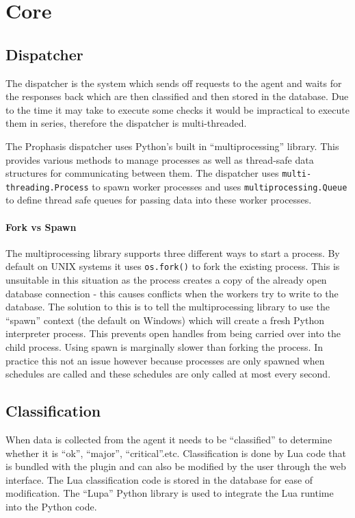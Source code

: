 \documentclass[bsc,logo,twoside,parskip,singlespacing,notimes]{infthesis}
\begin{document}
\section{Core}
\subsection{Dispatcher}

	The dispatcher is the system which sends off requests to the agent and waits
	for the responses back which are then classified and then stored in the
	database.  Due to the time it may take to execute some checks it would be
	impractical to execute them in series, therefore the dispatcher is
	multi-threaded.


	The Prophasis dispatcher uses Python's built in ``multiprocessing'' library. This
	provides various methods to manage processes as well as thread-safe data
	structures for communicating between them.  The dispatcher uses\linebreak
	\texttt{multi-threading.Process} to spawn worker processes and uses\linebreak
	\texttt{multiprocessing.Queue} to define thread safe queues for passing data
	into these worker processes.

\paragraph*{Fork vs Spawn}
	The multiprocessing library supports three different ways to start a process.
	By default on UNIX systems it uses \texttt{os.fork()} to fork the existing
	process. This is unsuitable in this situation as the process creates a copy of
	the already open database connection - this causes conflicts when the workers
	try to write to the database.  The solution to this is to tell the
	multiprocessing library to use the ``spawn'' context (the default on Windows)
	which will create a fresh Python interpreter process. This prevents open
	handles from being carried over into the child process. Using spawn is
	marginally slower than forking the process. In practice this not an issue however
	because processes are only spawned when schedules are called and these
	schedules are only called at most every second.

\subsection{Classification}

	When data is collected from the agent it needs to be ``classified'' to determine
	whether it is ``ok'', ``major'', ``critical''.etc.  Classification is done by Lua
	code that is bundled with the plugin and can also be modified by the user
	through the web interface.  The Lua classification code is stored in the
	database for ease of modification.  The ``Lupa'' Python library is used to
	integrate the Lua runtime into the Python code.
\end{document}

